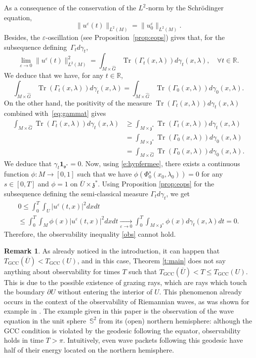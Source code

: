 \documentclass[10pt]{amsart}
\newcommand{\GCC}{\mathrm{GCC}}
\newcommand{\bun}{\mathbf{1}}
\DeclareMathOperator{\Tr}{Tr}
\theoremstyle{plain}
\theoremstyle{definition}
\newtheorem{remark}[theorem]{Remark}
\let\eps\varepsilon
\def\R{{\mathbb R}}
\def\bbS{{\mathbb S}}
\newcommand{\Tend}[2]{\mathbin{\mathop{\longrightarrow}\limits_{#1\to#2}}}
\begin{document}
As a consequence of the conservation of the $L^2$-norm by the Schrödinger equation,
\[
\| u^\eps(t) \|_{L^2(M)}=\| u^\eps_0\|_{L^2(M)}.
\]
Besides, the $\eps$-oscillation (see Proposition~\ref{prop:eops}) gives that, for the subsequence defining~$\Gamma_t d\gamma_t$,
\[
\lim_{\eps \to 0}\| u^\eps(t) \|^2_{L^2(M)}
= \int_{M\times \widehat G} \Tr (\Gamma_t(x,\lambda)) d\gamma_t(x,\lambda),\quad \forall t\in\R.
\]
We deduce that we have, for any $t\in\R$,
\[
\int_{M\times \widehat G} \Tr (\Gamma_t(x,\lambda)) d\gamma_t(x,\lambda)=
\int_{M\times \widehat G} \Tr (\Gamma_0(x,\lambda)) d\gamma_0(x,\lambda).
\]
On the other hand, the positivity of the measure $ \Tr (\Gamma_t(x,\lambda)) d\gamma_t(x,\lambda)$ combined with~\eqref{eq:gammat} gives
\begin{align*}\int_{M\times \widehat G} \Tr (\Gamma_t(x,\lambda)) d\gamma_t(x,\lambda)&\geq
\int_{M\times \mathfrak z^*} \Tr (\Gamma_t(x,\lambda))d\gamma_t(x,\lambda)\\
&=
\int_{M\times \mathfrak z^*} \Tr (\Gamma_0(x,\lambda))d\gamma_0(x,\lambda)\\
&=\int_{M\times \widehat G} \Tr (\Gamma_0(x,\lambda)) d\gamma_0(x,\lambda).
\end{align*}
We deduce that $\gamma_t \bun_{\mathfrak v^*}=0$. Now, using \eqref{e:hypfermee}, there exists a continuous function $\phi:M\to [0,1]$ such that we have $\phi(\Phi_0^s(x_0,\lambda_0))=0$ for any $s\in [0,T]$ and $\phi=1$ on $\overline{U}\times \mathfrak z^*$. Using Proposition \ref{prop:eops} for the subsequence defining the semi-classical measure $\Gamma_t d\gamma_t$, we get
\begin{multline*}
0\leq \int_0^{T} \int_U | u^\eps(t,x)|^2 dx dt\\[-5pt]
\leq \int_0^{T} \int_M \phi(x)| u^\eps(t,x)|^2 dx dt \Tend{\eps}{0} \int_0^{T} \int_{M\times \mathfrak z^*} \phi(x)d\gamma_t (x,\lambda) dt=0.
\end{multline*}
Therefore, the observability inequality \eqref{obs} cannot hold.
\begin{remark} \label{r:grazing}
As already noticed in the introduction, it can happen that $T_\GCC(\overline{U})<T_\GCC(U)$, and in this case, Theorem \ref{t:main} does not say anything about observability for times $T$ such that $T_\GCC(\overline{U})<T\leq T_\GCC(U)$. This is due to the possible existence of grazing rays, which are rays which touch the boundary $\partial U$ without entering the interior of $U$. This phenomenon already occurs in the context of the observability of Riemannian waves, as was shown for example in \cite[\S VI.B]{Leb2}. The example given in this paper is the observation of the wave equation in the unit sphere~$\bbS^2$ from its (open) northern hemisphere: although the GCC condition is violated by the geodesic following the equator, observability holds in time $T>\pi$. Intuitively, even wave packets following this geodesic have half of their energy located on the northern hemisphere.
\end{remark}
\end{document}
